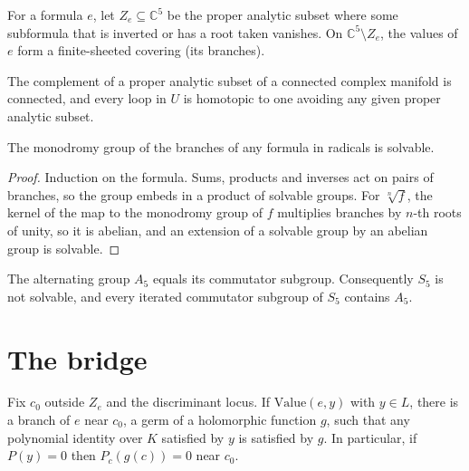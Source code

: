 \begin{definition}
  \label{def:branches}
  For a formula $e$, let $Z_e \subseteq \mathbb{C}^5$ be the proper analytic subset where some
  subformula that is inverted or has a root taken vanishes. On $\mathbb{C}^5 \setminus Z_e$, the
  values of $e$ form a finite-sheeted covering (its branches).
\end{definition}

\begin{lemma}
  \label{lem:complement-connected}
  The complement of a proper analytic subset of a connected complex manifold is connected,
  and every loop in $U$ is homotopic to one avoiding any given proper analytic subset.
\end{lemma}

\begin{lemma}
  \label{lem:radical-monodromy-solvable}
  The monodromy group of the branches of any formula in radicals is solvable.
\end{lemma}

\begin{proof}
  Induction on the formula. Sums, products and inverses act on pairs of branches, so the
  group embeds in a product of solvable groups. For $\sqrt[n]{f}$, the kernel of the map to the
  monodromy group of $f$ multiplies branches by $n$-th roots of unity, so it is abelian, and an
  extension of a solvable group by an abelian group is solvable.
\end{proof}

\begin{lemma}[$A_5$ is perfect]
  \label{lem:a5-perfect}
  The alternating group $A_5$ equals its commutator subgroup. Consequently $S_5$ is not
  solvable, and every iterated commutator subgroup of $S_5$ contains $A_5$.
\end{lemma}

\section{The bridge}

\begin{lemma}
  \label{lem:bridge}
  Fix $c_0$ outside $Z_e$ and the discriminant locus. If $\mathrm{Value}(e, y)$ with $y \in L$,
  there is a branch of $e$ near $c_0$, a germ of a holomorphic function $g$, such that any
  polynomial identity over $K$ satisfied by $y$ is satisfied by $g$. In particular, if $P(y) = 0$
  then $P_c(g(c)) = 0$ near $c_0$.
\end{lemma}

